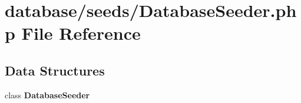\section{database/seeds/\+Database\+Seeder.php File Reference}
\label{_database_seeder_8php}
\subsection*{Data Structures}
\begin{DoxyCompactItemize}
\item 
class {\bf Database\+Seeder}
\end{DoxyCompactItemize}
